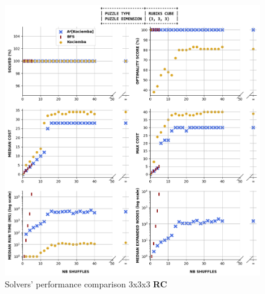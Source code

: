 \begin{figure}[H]
\centering
\includegraphics[scale=0.50]{./Figures/333RCPerformance}
\caption[333RCPerformance]{Solvers' performance comparison 3x3x3 \textbf{RC}}
\label{fig:333RCPerformance}
\end{figure}
